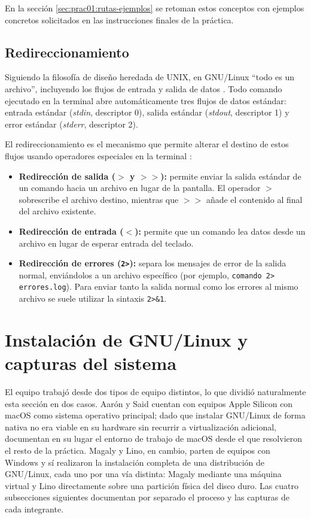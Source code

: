 En la sección \ref{sec:prac01:rutas-ejemplos} se retoman estos conceptos con ejemplos concretos solicitados en las instrucciones finales de la práctica.

\subsection{Redireccionamiento}
\label{sec:prac01:redir-teoria}
Siguiendo la filosofía de diseño heredada de UNIX, en GNU/Linux ``todo es un archivo'', incluyendo los flujos de entrada y salida de datos \cite{mitchell:advanced-linux-prog:2001}. Todo comando ejecutado en la terminal abre automáticamente tres flujos de datos estándar: entrada estándar (\textit{stdin}, descriptor 0), salida estándar (\textit{stdout}, descriptor 1) y error estándar (\textit{stderr}, descriptor 2).

El redireccionamiento es el mecanismo que permite alterar el destino de estos flujos usando operadores especiales en la terminal \cite{shotts:linux-command-line:2019}:

\begin{itemize}[leftmargin=*]
    \item \textbf{Redirección de salida (\ensuremath{>} y \ensuremath{>>}):} permite enviar la salida estándar de un comando hacia un archivo en lugar de la pantalla. El operador \ensuremath{>} sobrescribe el archivo destino, mientras que \ensuremath{>>} añade el contenido al final del archivo existente.
    \item \textbf{Redirección de entrada (\ensuremath{<}):} permite que un comando lea datos desde un archivo en lugar de esperar entrada del teclado.
    \item \textbf{Redirección de errores (\texttt{2>}):} separa los mensajes de error de la salida normal, enviándolos a un archivo específico (por ejemplo, \texttt{comando 2> errores.log}). Para enviar tanto la salida normal como los errores al mismo archivo se suele utilizar la sintaxis \texttt{2>\&1}.
\end{itemize}

\section{Instalación de GNU/Linux y capturas del sistema}
\label{sec:prac01:instalacion}

El equipo trabajó desde dos tipos de equipo distintos, lo que dividió naturalmente esta sección en dos casos. Aarón y Said cuentan con equipos Apple Silicon con macOS como sistema operativo principal; dado que instalar GNU/Linux de forma nativa no era viable en su hardware sin recurrir a virtualización adicional, documentan en su lugar el entorno de trabajo de macOS desde el que resolvieron el resto de la práctica. Magaly y Lino, en cambio, parten de equipos con Windows y sí realizaron la instalación completa de una distribución de GNU/Linux, cada uno por una vía distinta: Magaly mediante una máquina virtual y Lino directamente sobre una partición física del disco duro. Las cuatro subsecciones siguientes documentan por separado el proceso y las capturas de cada integrante.

